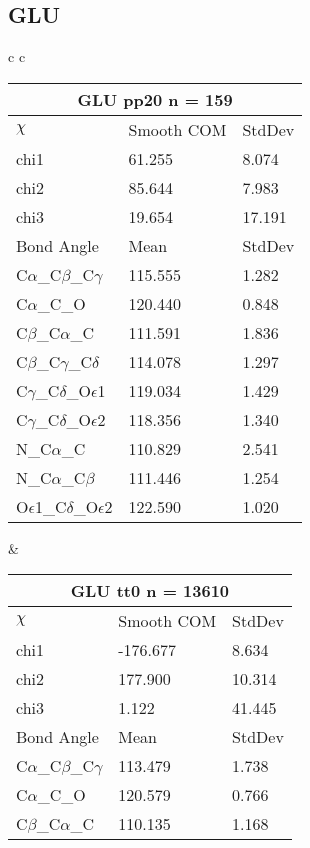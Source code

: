 \newpage
\subsection{GLU}

\begin{longtable}{ c c }

  \begin{tabular}{ l l l }
  \toprule
  \multicolumn{3}{c}{GLU \textbf{pp20} n = 159} \\ \toprule
  $\chi$       & Smooth COM & StdDev \\ \midrule
  chi1 & 61.255 & 8.074 \\ 
  chi2 & 85.644 & 7.983 \\ 
  chi3 & 19.654 & 17.191 \\ \midrule
  Bond Angle   & Mean     & StdDev \\ \midrule
  C$\alpha$\_C$\beta$\_C$\gamma$ & 115.555 & 1.282\\
  C$\alpha$\_C\_O & 120.440 & 0.848\\
  C$\beta$\_C$\alpha$\_C & 111.591 & 1.836\\
  C$\beta$\_C$\gamma$\_C$\delta$ & 114.078 & 1.297\\
  C$\gamma$\_C$\delta$\_O$\epsilon$1 & 119.034 & 1.429\\
  C$\gamma$\_C$\delta$\_O$\epsilon$2 & 118.356 & 1.340\\
  N\_C$\alpha$\_C & 110.829 & 2.541\\
  N\_C$\alpha$\_C$\beta$ & 111.446 & 1.254\\
  O$\epsilon$1\_C$\delta$\_O$\epsilon$2 & 122.590 & 1.020\\
  \bottomrule
  \end{tabular}
  &
  \begin{tabular}{ l l l }
  \toprule
  \multicolumn{3}{c}{GLU \textbf{tt0} n = 13610} \\ \toprule
  $\chi$       & Smooth COM & StdDev \\ \midrule
  chi1 & -176.677 & 8.634 \\ 
  chi2 & 177.900 & 10.314 \\ 
  chi3 & 1.122 & 41.445 \\ \midrule
  Bond Angle   & Mean     & StdDev \\ \midrule
  C$\alpha$\_C$\beta$\_C$\gamma$ & 113.479 & 1.738\\
  C$\alpha$\_C\_O & 120.579 & 0.766\\
  C$\beta$\_C$\alpha$\_C & 110.135 & 1.168\\

\end{tabular}
\end{longtable}
